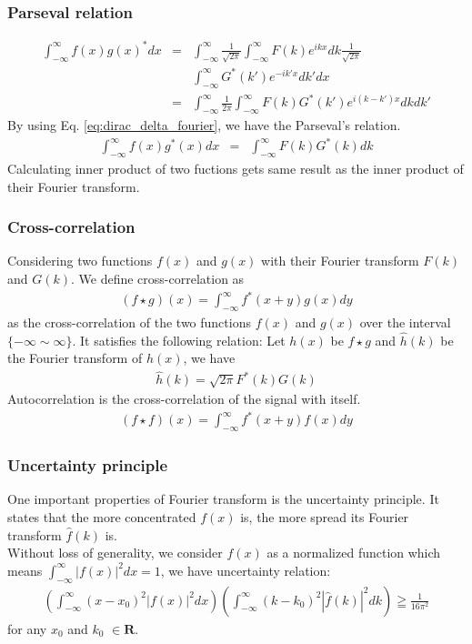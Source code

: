 \documentclass{beamer}
\begin{document}
\begin{frame}
\frametitle{Parseval relation}
\begin{eqnarray}
\int_{-\infty}^{\infty}f(x)g(x)^* dx &=&\int_{-\infty}^{\infty}  \frac{1}{\sqrt{2\pi}} \int_{-\infty}^{\infty} F(k) e^{ikx}dk \frac{1}{\sqrt{2\pi}} \nonumber \\
&&\int_{-\infty}^{\infty}G^*(k') e^{-ik'x}dk' dx\nonumber \\
&=&\int_{-\infty}^{\infty} \frac{1}{2\pi} \int_{-\infty}^{\infty} F(k)G^*(k')e^{i(k-k')x} dk dk' \nonumber
\end{eqnarray}
By using Eq. \ref{eq:dirac_delta_fourier}, we have the Parseval's relation.
\begin{eqnarray}
\int_{-\infty}^{\infty}f(x)g^*(x) dx &=& \int_{-\infty}^{\infty}F(k)G^*(k)dk
\label{eq:parseval_relation}
\end{eqnarray}
Calculating inner product of two fuctions gets same result as the inner product of their Fourier transform.
\end{frame}
\begin{frame}
\frametitle{Cross-correlation}
Considering two functions $f(x)$ and $g(x)$ with their Fourier transform $F(k)$ and $G(k)$. We define cross-correlation as
\begin{eqnarray}
(f\star g)(x) = \int_{-\infty}^{\infty}f^*(x+y)g(x)dy
\label{eq:cross_correlation}
\end{eqnarray}
as the cross-correlation of the two functions $f(x)$ and $g(x)$ over the interval $\{ -\infty \sim \infty \}$. It satisfies the following relation:
Let $h(x)$ be $f \star g$ and $\hat{h}(k)$ be the Fourier transform of $h(x)$, we have
\begin{eqnarray}
\hat{h}(k) = \sqrt{2\pi}F^*(k)G(k)
\label{eq:cross_correlation_FT}
\end{eqnarray}
Autocorrelation is the cross-correlation of the signal with itself.
\begin{eqnarray}
(f\star f)(x) = \int_{-\infty}^{\infty}f^*(x+y)f(x)dy
\label{eq:autocorrelation}
\end{eqnarray}
\end{frame}
\begin{frame}
\frametitle{Uncertainty principle}
One important properties of Fourier transform is the uncertainty principle. It states that the more concentrated $f(x)$ is, the more spread its Fourier transform $\hat{f}(k)$ is.\\
Without loss of generality, we consider $f(x)$ as a normalized function which means $\int_{-\infty}^{\infty}|f(x)|^2 dx = 1$, we have uncertainty relation:
\begin{eqnarray}
\left( \int_{-\infty}^{\infty}(x-x_0)^2|f(x)|^2 dx\right) \left( \int_{-\infty}^{\infty}(k-k_0)^2|\hat{f}(k)|^2 dk\right) \geqq \frac{1}{16\pi^2}
\label{eq:uncertainty_wiki}
\end{eqnarray}
for any $x_0$ and $k_0$ $\in \mathbf{R}$.~\cite{wiki_FT}
\end{frame}
\end{document}

